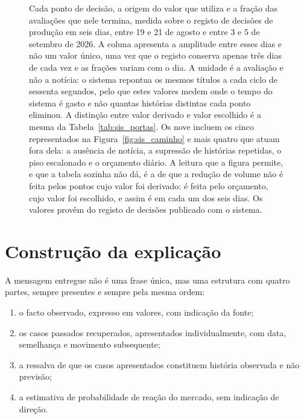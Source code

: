 \begin{figure}[!htbp]
\caption[Os nove pontos de decisão, a origem do seu valor e o que cada um elimina]{Cada ponto de decisão,
a origem do valor que utiliza e a fração das avaliações que nele termina, medida sobre o registo
de decisões de produção em seis dias, entre 19 e 21 de agosto e entre 3 e 5 de setembro de 2026.
A coluna apresenta a amplitude entre esses dias e não um valor único, uma vez que o registo
conserva apenas três dias de cada vez e as frações variam com o dia. A unidade é a avaliação
e não a notícia: o sistema repontua os mesmos títulos a cada ciclo de sessenta segundos, pelo que
estes valores medem onde o tempo do sistema é gasto e não quantas histórias distintas cada ponto
eliminou. A distinção entre valor derivado e valor escolhido é a mesma da
Tabela~\ref{tab:sis_portas}. Os nove incluem os cinco representados na
Figura~\ref{fig:sis_caminho} e mais quatro que atuam fora dela: a ausência de notícia, a
supressão de histórias repetidas, o piso escalonado e o orçamento diário. A leitura que a
figura permite, e que a tabela sozinha não dá, é a de que a redução de volume não é feita
pelos pontos cujo valor foi derivado: é feita pelo
orçamento, cujo valor foi escolhido, e assim é em cada um dos seis dias. Os valores provêm do registo de decisões publicado com o sistema.}
\label{fig:sis_razoes}
\end{figure}


\section{Construção da explicação}
\label{sec:sis_explicacao}

A mensagem entregue não é uma frase única, mas uma estrutura com quatro partes, sempre presentes e
sempre pela mesma ordem:

\begin{enumerate}
  \item o facto observado, expresso em valores, com indicação da fonte;
  \item os casos passados recuperados, apresentados individualmente, com data, semelhança e
        movimento subsequente;
  \item a ressalva de que os casos apresentados constituem história observada e não previsão;
  \item a estimativa de probabilidade de reação do mercado, sem indicação de direção.
\end{enumerate}

